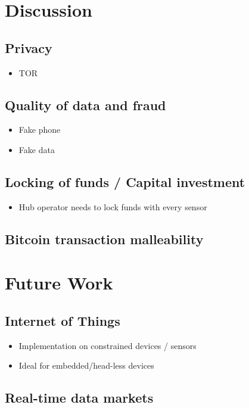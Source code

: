\documentclass{sig-alternate}
\begin{document}
\section{Discussion}

	\subsection{Privacy}
	\begin{itemize}
	\item{TOR}
	\end{itemize}

	\subsection{Quality of data and fraud}
	\begin{itemize}
	\item Fake phone
	\item Fake data
	\end{itemize}

	\subsection{Locking of funds / Capital investment}
	\begin{itemize}
	\item Hub operator needs to lock funds with every sensor
	\end{itemize}

	\subsection{Bitcoin transaction malleability}

\section{Future Work}

	\subsection{Internet of Things}

	\begin{itemize}
	\item Implementation on constrained devices / sensors
	\item Ideal for embedded/head-less devices
	\end{itemize}

	\subsection{Real-time data markets}
\end{document}
